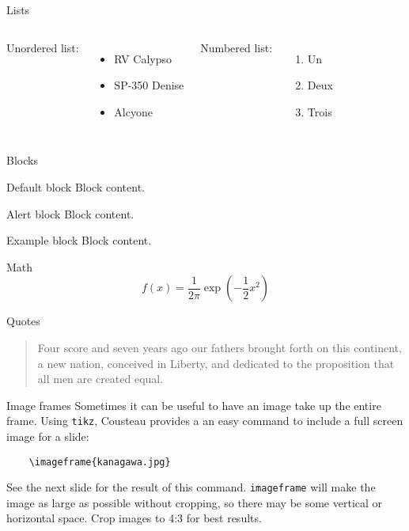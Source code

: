 \documentclass{beamer}
\begin{document}
\begin{frame}{Lists}
  \begin{columns}
    Unordered list:
    \begin{itemize}
    \item RV Calypso
    \item SP-350 Denise
    \item Alcyone
    \end{itemize}

    Numbered list:
    \begin{enumerate}
    \item Un
    \item Deux
    \item Trois
    \end{enumerate}
  \end{columns}
  
\end{frame}

\begin{frame}{Blocks}

  \begin{block}{Default block}
    Block content.
  \end{block}

  \begin{alertblock}{Alert block}
    Block content.
  \end{alertblock}

  \begin{exampleblock}{Example block}  
    Block content.
  \end{exampleblock}

\end{frame}

\begin{frame}{Math}
  \[f(x) = \frac{1}{2\pi}\exp\left( -\frac{1}{2}x^2 \right)\]
\end{frame}

\begin{frame}{Quotes}
  \begin{quote}
    Four score and seven years ago our fathers brought forth on this continent, a new nation, conceived in Liberty, and dedicated to the proposition that all men are created equal.
  \end{quote}
\end{frame}

\begin{frame}[fragile]{Image frames}
  Sometimes it can be useful to have an image take up the entire frame. Using \texttt{tikz}, Cousteau provides a an easy command to include a full screen image for a slide:
\begin{verbatim}
    \imageframe{kanagawa.jpg}
\end{verbatim}
See the next slide for the result of this command. \texttt{imageframe} will make the image as large as possible without cropping, so there may be some vertical or horizontal space. Crop images to 4:3 for best results. 
\end{frame}
\end{document}
